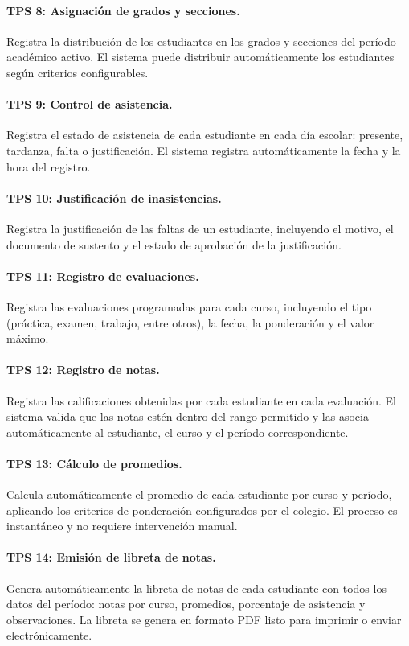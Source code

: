 \documentclass[12pt,a4paper,oneside]{report}
\begin{document}
\paragraph{TPS 8: Asignación de grados y secciones.} Registra la distribución de los estudiantes en los grados y secciones del período académico activo. El sistema puede distribuir automáticamente los estudiantes según criterios configurables.

\paragraph{TPS 9: Control de asistencia.} Registra el estado de asistencia de cada estudiante en cada día escolar: presente, tardanza, falta o justificación. El sistema registra automáticamente la fecha y la hora del registro.

\paragraph{TPS 10: Justificación de inasistencias.} Registra la justificación de las faltas de un estudiante, incluyendo el motivo, el documento de sustento y el estado de aprobación de la justificación.

\paragraph{TPS 11: Registro de evaluaciones.} Registra las evaluaciones programadas para cada curso, incluyendo el tipo (práctica, examen, trabajo, entre otros), la fecha, la ponderación y el valor máximo.

\paragraph{TPS 12: Registro de notas.} Registra las calificaciones obtenidas por cada estudiante en cada evaluación. El sistema valida que las notas estén dentro del rango permitido y las asocia automáticamente al estudiante, el curso y el período correspondiente.

\paragraph{TPS 13: Cálculo de promedios.} Calcula automáticamente el promedio de cada estudiante por curso y período, aplicando los criterios de ponderación configurados por el colegio. El proceso es instantáneo y no requiere intervención manual.

\paragraph{TPS 14: Emisión de libreta de notas.} Genera automáticamente la libreta de notas de cada estudiante con todos los datos del período: notas por curso, promedios, porcentaje de asistencia y observaciones. La libreta se genera en formato PDF listo para imprimir o enviar electrónicamente.
\end{document}
